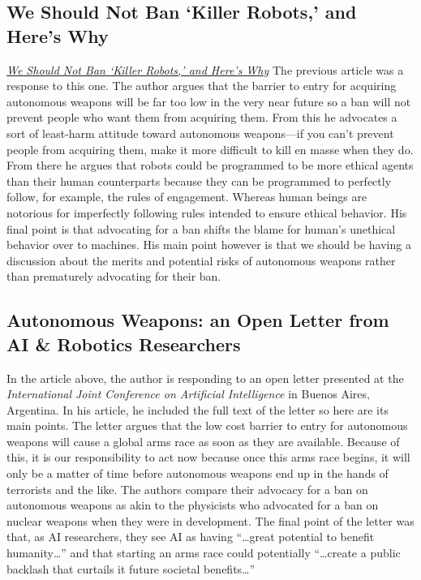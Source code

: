 \documentclass[11pt]{article}  %
\begin{document}
\begin{enumerate}
\begin{enumerate}
    \subsection{We Should Not Ban ‘Killer Robots,’ and Here’s Why}
    \par\href{http://spectrum.ieee.org/automaton/robotics/artificial-intelligence/we-should-not-ban-killer-robots}{\emph{We
    Should Not Ban ‘Killer Robots,’ and Here’s Why}} The previous article was a
    response to this one.  The author argues that the barrier to entry for
    acquiring autonomous weapons will be far too low in the very near future so
    a ban will not prevent people who want them from acquiring them.  From this he
    advocates a sort of least-harm attitude toward autonomous weapons---if you
    can't prevent people from acquiring them, make it more difficult to kill en
    masse when they do. From there he argues that robots could be programmed to
    be more ethical agents than their human counterparts because they can be
    programmed to perfectly follow, for example, the rules of engagement. 
    Whereas human beings are notorious for imperfectly following rules intended
    to ensure ethical behavior. His final point is that advocating for a ban
    shifts the blame for human's unethical behavior over to machines. His main
    point however is that we should be having a discussion about the merits and
    potential risks of autonomous weapons rather than prematurely advocating for
    their ban.
    
    \subsection{Autonomous Weapons: an Open Letter from AI &
    Robotics Researchers}  In the article above, the author is responding to an
    open letter presented at the \emph{International Joint Conference on Artificial Intelligence} in Buenos Aires, Argentina. In his article, he included the full text of the
    letter so here are its main points.  The letter argues that the low cost
    barrier to entry for autonomous weapons will cause a global arms race as
    soon as they are available.  Because of this, it is our responsibility to act now
    because once this arms race begins, it will only be a matter of time before
    autonomous weapons end up in the hands of terrorists and the like. The
    authors compare their advocacy for a ban on autonomous weapons as akin to
    the physicists who advocated for a ban on nuclear weapons when they were in
    development.  The final point of the letter was that, as AI researchers,
    they see AI as having ``\dots great potential to benefit humanity\dots'' and
    that starting an arms race could potentially ``\dots create a public
    backlash that curtails it future societal benefits\dots''
    \end{enumerate}
    \end{enumerate}
    
    
\end{document}
